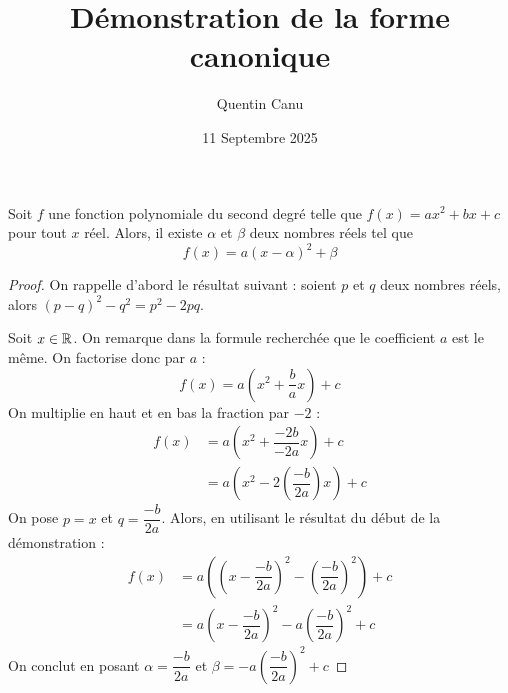 \documentclass{article}
\title{Démonstration de la forme canonique}
\author{Quentin Canu}
\date{11 Septembre 2025}
\begin{document}
\maketitle

\begin{proposition}
Soit $f$ une fonction polynomiale du second degré telle que $f(x) = ax^2 + bx + c$ pour tout $x$ réel. Alors, il existe $\alpha$ et $\beta$ deux nombres réels tel que
\begin{equation*}
f(x) = a(x - \alpha)^2 + \beta
\end{equation*}
\end{proposition}
\begin{proof}
On rappelle d'abord le résultat suivant : soient $p$ et $q$ deux nombres réels, alors $(p - q)^2 - q^2 = p^2 - 2pq$.

Soit $x \in \mathbb{R}$. On remarque dans la formule recherchée que le coefficient $a$ est le même. On factorise donc par $a$ :
\begin{equation*}
f(x) = a \left(x^2 + \dfrac{b}{a}x\right) + c
\end{equation*}
On multiplie \og en haut et en bas \fg la fraction par $-2$ :
\begin{equation*}
\begin{aligned}
f(x) &= a \left(x^2 + \dfrac{-2b}{-2a}x\right) + c\\
&= a \left(x^2 -2 \left(\dfrac{-b}{2a}\right)x\right) + c
\end{aligned}
\end{equation*}
On pose $p = x$ et $q = \dfrac{-b}{2a}$. Alors, en utilisant le résultat du début de la démonstration :
\begin{equation*}
\begin{aligned}
f(x) &= a\left(\left(x - \dfrac{-b}{2a}\right)^2 - \left(\dfrac{-b}{2a}\right)^2\right) + c\\
&= a\left(x-\dfrac{-b}{2a}\right)^2 - a\left(\dfrac{-b}{2a}\right)^2 + c
\end{aligned}
\end{equation*}
On conclut en posant $\alpha = \dfrac{-b}{2a}$ et $\beta = -a \left(\dfrac{-b}{2a}\right)^2 + c$
\end{proof}
\end{document}
